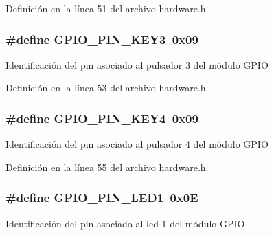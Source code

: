 Definición en la línea 51 del archivo hardware.\+h.

\subsubsection[{\texorpdfstring{G\+P\+I\+O\+\_\+\+P\+I\+N\+\_\+\+K\+E\+Y3}{GPIO_PIN_KEY3}}]{\setlength{\rightskip}{0pt plus 5cm}\#define G\+P\+I\+O\+\_\+\+P\+I\+N\+\_\+\+K\+E\+Y3~0x09}\hypertarget{group__hardware_ga6058161cd4273d1df2af95589e043055}{}\label{group__hardware_ga6058161cd4273d1df2af95589e043055}
Identificación del pin asociado al pulsador 3 del módulo G\+P\+IO 

Definición en la línea 53 del archivo hardware.\+h.

\subsubsection[{\texorpdfstring{G\+P\+I\+O\+\_\+\+P\+I\+N\+\_\+\+K\+E\+Y4}{GPIO_PIN_KEY4}}]{\setlength{\rightskip}{0pt plus 5cm}\#define G\+P\+I\+O\+\_\+\+P\+I\+N\+\_\+\+K\+E\+Y4~0x09}\hypertarget{group__hardware_gabeaec154a7007cd91de9a8c775f4242f}{}\label{group__hardware_gabeaec154a7007cd91de9a8c775f4242f}
Identificación del pin asociado al pulsador 4 del módulo G\+P\+IO 

Definición en la línea 55 del archivo hardware.\+h.

\subsubsection[{\texorpdfstring{G\+P\+I\+O\+\_\+\+P\+I\+N\+\_\+\+L\+E\+D1}{GPIO_PIN_LED1}}]{\setlength{\rightskip}{0pt plus 5cm}\#define G\+P\+I\+O\+\_\+\+P\+I\+N\+\_\+\+L\+E\+D1~0x0E}\hypertarget{group__hardware_gaa4637d2cb87305ea71351291117a95f6}{}\label{group__hardware_gaa4637d2cb87305ea71351291117a95f6}
Identificación del pin asociado al led 1 del módulo G\+P\+IO 

